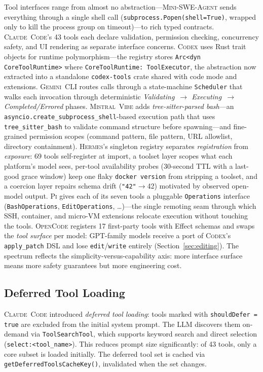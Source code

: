\documentclass[11pt,a4paper]{article}
\newcommand{\clcode}{\textsc{Claude~Code}\xspace}
\newcommand{\cdx}{\textsc{Codex}\xspace}
\newcommand{\mswe}{\textsc{Mini-SWE-Agent}\xspace}
\newcommand{\vibe}{\textsc{Mistral~Vibe}\xspace}
\newcommand{\gemini}{\textsc{Gemini~CLI}\xspace}
\newcommand{\hrm}{\textsc{Hermes}\xspace}
\newcommand{\pib}{\textsc{Pi}\xspace}
\newcommand{\ocd}{\textsc{OpenCode}\xspace}
\begin{document}
Tool interfaces range from almost no abstraction---\mswe{} sends everything through a single shell call (\texttt{subprocess.Popen(shell=True)}, wrapped only to kill the process group on timeout)---to rich typed contracts.
\clcode{}'s 43 tools each declare validation, permission checking, concurrency safety, and UI rendering as separate interface concerns.
\cdx{} uses Rust trait objects for runtime polymorphism---the registry stores \texttt{Arc<dyn CoreToolRuntime>} where \texttt{CoreToolRuntime: ToolExecutor}, the abstraction now extracted into a standalone \texttt{codex-tools} crate shared with code mode and extensions.
\gemini{} routes calls through a state-machine \texttt{Scheduler} that walks each invocation through deterministic \emph{Validating~$\to$ Executing~$\to$ Completed/Errored} phases.
\vibe{} adds \emph{tree-sitter-parsed bash}---an \texttt{asyncio.create\_subprocess\_shell}-based execution path that uses \texttt{tree\_sitter\_bash} to validate command structure before spawning---and fine-grained permission scopes (command pattern, file pattern, URL allowlist, directory containment).
\hrm{}'s singleton registry separates \emph{registration} from \emph{exposure}: 69 tools self-register at import, a toolset layer scopes what each platform's model sees, per-tool availability probes (30-second TTL with a last-good grace window) keep one flaky \texttt{docker version} from stripping a toolset, and a coercion layer repairs schema drift (\texttt{"42"}$\to$42) motivated by observed open-model output.
\pib{} gives each of its seven tools a pluggable \texttt{Operations} interface (\texttt{BashOperations}, \texttt{EditOperations}, \ldots)---the single remoting seam through which SSH, container, and micro-VM extensions relocate execution without touching the tools.
\ocd{} registers 17 first-party tools with Effect schemas and swaps the \emph{tool surface} per model: GPT-family models receive a port of \cdx{}'s \texttt{apply\_patch} DSL and lose \texttt{edit}/\texttt{write} entirely (Section~\ref{sec:editing}).
The spectrum reflects the simplicity-versus-capability axis: more interface surface means more safety guarantees but more engineering cost.

\subsection{Deferred Tool Loading}
\label{sec:deferred}

\clcode{} introduced \emph{deferred tool loading}: tools marked with \texttt{shouldDefer = true} are excluded from the initial system prompt.
The LLM discovers them on-demand via \texttt{ToolSearchTool}, which supports keyword search and direct selection (\texttt{select:<tool\_name>}).
This reduces prompt size significantly: of 43 tools, only a core subset is loaded initially.
The deferred tool set is cached via \texttt{getDeferredToolsCacheKey()}, invalidated when the set changes.
\end{document}
